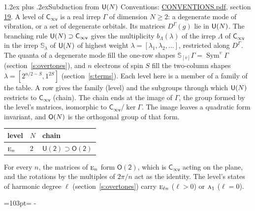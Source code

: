 \documentclass[10pt,a4paper]{article}
\makeatletter
\renewcommand\section{\@startsection{section}{1}{\z@}{-3ex plus -1ex minus -.2ex}%
  {1.2ex plus .2ex}{\normalfont\large\sffamily\bfseries\color{parttitle}}}
\newcommand{\needspace}[1]{\par\penalty-100\begingroup\dimen0=#1\relax\dimen2=\pagegoal
  \advance\dimen2-\pagetotal\ifdim\dimen0>\dimen2\relax\ifdim\dimen2>0pt\vfil\break\fi\fi
  \endgroup}
\numberwithin{equation}{section}
\newcommand{\grp}[1]{\mathsf{#1}}
\newcommand{\irr}[1]{\text{\normalfont\scshape #1}}
\newcommand{\repD}[1]{D^{#1}}
\newcommand{\schur}[1]{\mathbb{S}_{#1}}
\newcommand{\shape}[1]{[#1]}
\makeatother
\begin{document}
\section{Subduction from \texorpdfstring{$\grp{U(\mathnormal{N})}$}{U(N)}}\label{s:unitary}
Conventions: \href{../../CONVENTIONS.pdf}{CONVENTIONS.pdf}, section \href{../../CONVENTIONS.pdf\#conv.19}{19}.
\leavevmode\label{n:local.level.dimension}A level of $\grp{C_{\infty v}}$ is a real irrep $\Gamma$ of dimension $N \ge 2$: a degenerate mode of vibration, or a set of degenerate orbitals. \label{n:group.unitary}Its matrices $\repD{\Gamma}(g)$ lie in $\grp{U(\mathnormal{N})}$. \label{n:irrep.schur}\label{n:shape.partition}\label{n:local.partition}\label{n:function.multiplicity.unitary}The branching rule $\grp{U(\mathnormal{N})} \supset \grp{C_{\infty v}}$ gives the multiplicity $b_\Lambda(\lambda)$ of the irrep $\Lambda$ of $\grp{C_{\infty v}}$ in the irrep $\schur{\lambda}$ of $\grp{U(\mathnormal{N})}$ of highest weight $\lambda = \shape{\lambda_1, \lambda_2, \dots}$, restricted along $\repD{\Gamma}$. \label{n:local.partition.power}\label{n:local.electrons}\label{n:local.spin}The quanta of a degenerate mode fill the one-row shapes $\schur{\shape{v}}\Gamma = \operatorname{Sym}^{v}\Gamma$ (section~\ref{s:overtones}), and $n$ electrons of spin $S$ fill the two-column shapes $\lambda = \shape{2^{n/2-S}, 1^{2S}}$ (section~\ref{s:terms}).
Each level here is a member of a family of the table. \label{n:head.level}\label{n:head.chain}A row gives the family (level) and the subgroups through which $\grp{U(\mathnormal{N})}$ restricts to $\grp{C_{\infty v}}$ (chain). The chain ends at the image of $\Gamma$, the group formed by the level's matrices, isomorphic to $\grp{C_{\infty v}}/\ker\Gamma$. The image leaves a quadratic form invariant, and $\grp{O(\mathnormal{N})}$ is the orthogonal group of that form.
{\small\begin{longtable}{@{}lll@{}}\toprule
level & $N$ & chain\\\midrule\endhead
\bottomrule\endfoot\endlastfoot
$\irr{e}_{n}$ & $2$ & $\grp{U(2)} \supset \grp{O(2)}$\\
\bottomrule\end{longtable}}
For every $n$, the matrices of $\irr{e}_n$ form $\grp{O(2)}$, which is $\grp{C_{\infty v}}$ acting on the plane, and the rotations by the multiples of $2\pi/n$ act as the identity. \label{n:index.harmonic.degree}The level's states of harmonic degree $\ell$ (section~\ref{s:overtones}) carry $\irr{e}_{\ell n}$ ($\ell > 0$) or $\irr{a}_{1}$ ($\ell = 0$).
\needspace{103pt}
\end{document}
